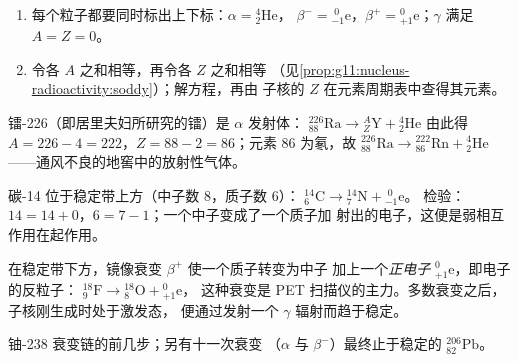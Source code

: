 \begin{method}[配平衰变方程]\label{met:g11:nucleus-radioactivity:balance}
\begin{enumerate}
  \item 每个粒子都要同时标出上下标：$\alpha = {}^{4}_{2}\mathrm{He}$，
        $\beta^- = {}^{\;0}_{-1}\mathrm{e}$，$\beta^+ = {}^{0}_{+1}\mathrm{e}$；$\gamma$ 满足 $A = Z = 0$。
  \item 令各 $A$ 之和相等，再令各 $Z$ 之和相等
        （见\cref{prop:g11:nucleus-radioactivity:soddy}）；解方程，再由
        子核的 $Z$ 在元素周期表中查得其元素。
\end{enumerate}
\end{method}

\begin{example}[α 衰变]\label{ex:g11:nucleus-radioactivity:alpha}
镭-226（即居里夫妇所研究的镭）是 $\alpha$ 发射体：
${}^{226}_{88}\mathrm{Ra} \to {}^{A}_{Z}\mathrm{Y} + {}^{4}_{2}\mathrm{He}$
由此得 $A = 226 - 4 = 222$，$Z = 88 - 2 = 86$；元素 $86$ 为氡，故
${}^{226}_{88}\mathrm{Ra} \to {}^{222}_{86}\mathrm{Rn} + {}^{4}_{2}\mathrm{He}$
——通风不良的地窖中的放射性气体。
\end{example}

\begin{example}[负 β 衰变]\label{ex:g11:nucleus-radioactivity:beta}
碳-14 位于稳定带上方（中子数 $8$，质子数 $6$）：
${}^{14}_{6}\mathrm{C} \to {}^{14}_{7}\mathrm{N} + {}^{\;0}_{-1}\mathrm{e}$。
检验：$14 = 14 + 0$，$6 = 7 - 1$；一个中子变成了一个质子加
射出的电子，这便是弱相互作用在起作用。
\end{example}

\begin{remark}[正 β 衰变与 γ 辐射]\label{rem:g11:nucleus-radioactivity:betaplus}
在稳定带下方，镜像衰变 $\beta^+$ 使一个质子转变为中子
加上一个\emph{正电子} ${}^{0}_{+1}\mathrm{e}$，即电子的反粒子：
${}^{18}_{9}\mathrm{F} \to {}^{18}_{8}\mathrm{O} + {}^{0}_{+1}\mathrm{e}$，
这种衰变是 PET 扫描仪的主力。多数衰变之后，子核刚生成时处于激发态，
便通过发射一个 $\gamma$ 辐射而趋于稳定。
\end{remark}

\begin{omfigure}

{\small 铀-238 衰变链的前几步；另有十一次衰变
（$\alpha$ 与 $\beta^-$）最终止于稳定的 ${}^{206}_{82}\mathrm{Pb}$。}
\end{omfigure}

